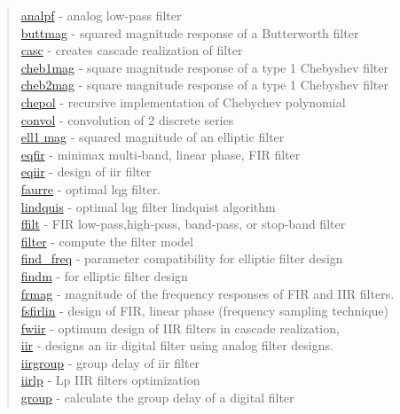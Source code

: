 \begin{quote}
\noindent
\hyperlink {analpf}{analpf} - analog low-pass filter \\
\hyperlink {buttmag}{buttmag} - squared magnitude response of a Butterworth filter \\
\hyperlink {casc}{casc} - creates cascade realization of filter \\
\hyperlink {cheb1mag}{cheb1mag} - square magnitude response of a type 1 Chebyshev filter \\
\hyperlink {cheb2mag}{cheb2mag} - square magnitude response of a type 1 Chebyshev filter \\
\hyperlink {chepol}{chepol} - recursive implementation of Chebychev polynomial \\
\hyperlink {convol}{convol} - convolution of 2 discrete series \\
\hyperlink {ell1 mag}{ell1 mag} - squared magnitude of an elliptic filter \\
\hyperlink {eqfir}{eqfir} - minimax multi-band, linear phase, FIR filter \\
\hyperlink {eqiir}{eqiir} - design of iir filter \\
\hyperlink {faurre}{faurre} - optimal lqg filter. \\
\hyperlink {lindquis}{lindquis} - optimal lqg filter lindquist algorithm \\
\hyperlink {ffilt}{ffilt} - FIR low-pass,high-pass, band-pass, or stop-band filter \\
\hyperlink {filter}{filter} - compute the filter model \\
\hyperlink {find_freq}{find\_freq} - parameter compatibility for elliptic filter design \\
\hyperlink {findm}{findm} - for elliptic filter design \\
\hyperlink {frmag}{frmag} - magnitude of the frequency responses of FIR and IIR filters. \\
\hyperlink {fsfirlin}{fsfirlin} - design of FIR, linear phase (frequency sampling technique) \\
\hyperlink {fwiir}{fwiir} - optimum design of IIR filters in cascade realization, \\
\hyperlink {iir}{iir} - designs an iir digital filter using analog filter designs. \\
\hyperlink {iirgroup}{iirgroup} - group delay of iir filter \\
\hyperlink {iirlp}{iirlp} - Lp IIR filters optimization \\
\hyperlink {group}{group} - calculate the group delay of a digital filter \\

\end{quote}
